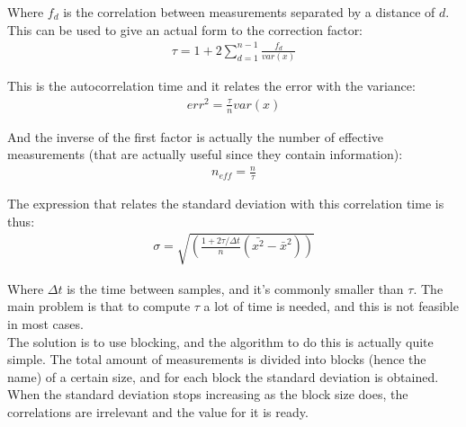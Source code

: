 \documentclass[x11names]{article}
\begin{document}
		Where $f_d$ is the correlation between measurements separated by a distance of $d$. This can be used to give an actual form to the correction factor:\\

		\begin{align}
			\tau=1+2\sum_{d=1}^{n-1}{\frac{f_d}{var\left(x\right)}}
		\end{align}

		This is the autocorrelation time and it relates the error with the variance:\\

		\begin{align}
			err^2=\frac{\tau}{n}var\left(x\right)
		\end{align}

		And the inverse of the first factor is actually the number of effective measurements (that are actually useful since they contain information):\\

		\begin{align}
			n_{eff}=\frac{n}{\tau}
		\end{align}

		The expression that relates the standard deviation with this correlation time is thus:\\

		\begin{align}
			\sigma=\sqrt{\left(\frac{1+2\tau/\Delta t}{n}\left(\bar{x^2}-\bar{x}^2\right)\right)}
		\end{align}

		Where $\Delta t$ is the time between samples, and it's commonly smaller than $\tau$. The main problem is that to compute $\tau$ a lot of time is needed, and this is not feasible in most cases.\\

		The solution is to use blocking, and the algorithm to do this is actually quite simple. The total amount of measurements is divided into blocks (hence the name) of a certain size, and for each block the standard deviation is obtained. When the standard deviation stops increasing as the block size does, the correlations are irrelevant and the value for it is ready.\\
\end{document}
